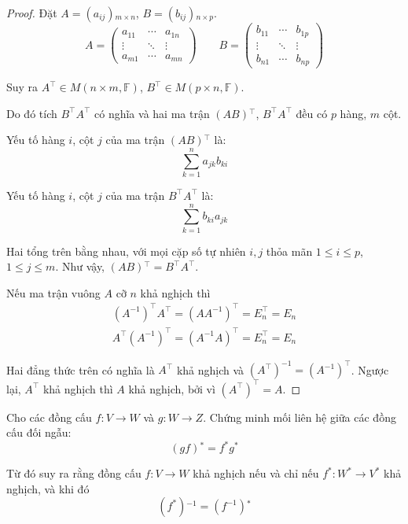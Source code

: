 \begin{proof}
    Đặt $A = (a_{ij}){}_{m\times n}$, $B = (b_{ij}){}_{n\times p}$.
    \[
        A =
        \begin{pmatrix}
            a_{11} & \cdots & a_{1n} \\
            \vdots & \ddots & \vdots \\
            a_{m1} & \cdots & a_{mn}
        \end{pmatrix}
        \qquad
        B =
        \begin{pmatrix}
            b_{11} & \cdots & b_{1p} \\
            \vdots & \ddots & \vdots \\
            b_{n1} & \cdots & b_{np}
        \end{pmatrix}
    \]
    
    Suy ra $A^{\top}\in M(n\times m, \mathbb{F})$, $B^{\top}\in M(p\times n, \mathbb{F})$.
    
    Do đó tích $B^{\top}A^{\top}$ có nghĩa và hai ma trận $(AB){}^{\top}$, $B^{\top}A^{\top}$ đều có $p$ hàng, $m$ cột.
    
    Yếu tố hàng $i$, cột $j$ của ma trận $(AB){}^{\top}$ là:
    \[
        \sum^{n}_{k=1}a_{jk}b_{ki}
    \]
    
    Yếu tố hàng $i$, cột $j$ của ma trận $B^{\top}A^{\top}$ là:
    \[
        \sum^{n}_{k=1}b_{ki}a_{jk}
    \]
    
    Hai tổng trên bằng nhau, với mọi cặp số tự nhiên $i, j$ thỏa mãn $1\le i\le p$, $1\le j\le m$. Như vậy, $(AB){}^{\top} = B^{\top}A^{\top}$.
    
    \bigskip
    
    Nếu ma trận vuông $A$ cỡ $n$ khả nghịch thì
    \[
        \begin{split}
            {(A^{-1})}^{\top}A^{\top} = {(AA^{-1})}^{\top} = E_{n}^{\top} = E_{n} \\
            A^{\top}{(A^{-1})}^{\top} = {(A^{-1}A)}^{\top} = E_{n}^{\top} = E_{n}
        \end{split}
    \]
    
    Hai đẳng thức trên có nghĩa là $A^{\top}$ khả nghịch và ${(A^{\top})}^{-1} = {(A^{-1})}^{\top}$. Ngược lại, $A^{\top}$ khả nghịch thì $A$ khả nghịch, bởi vì ${(A^{\top})}^{\top} = A$.
\end{proof}

\begin{exercise}
    Cho các đồng cấu $f: V\to W$ và $g: W\to Z$. Chứng minh mối liên hệ giữa các đồng cấu đối ngẫu:
    \[
        (gf){}^{*} = f^{*}g^{*}
    \]
    
    Từ đó suy ra rằng đồng cấu $f: V\to W$ khả nghịch nếu và chỉ nếu $f^{*}: W^{*}\to V^{*}$ khả nghịch, và khi đó
    \[
        (f^{*}){}^{-1} = (f^{-1}){}^{*}
    \]
\end{exercise}

